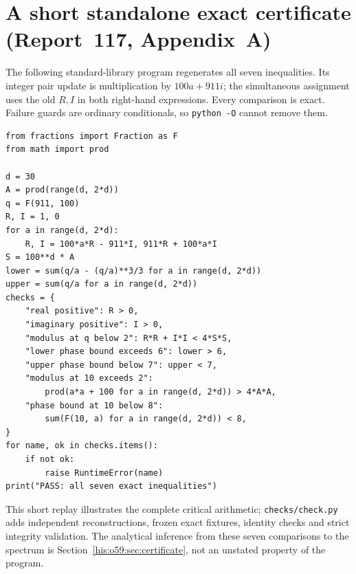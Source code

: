 \documentclass[11pt]{article}
\theoremstyle{remark}\newtheorem{remark}[theorem]{Remark}
\numberwithin{equation}{section}
\begin{document}
\section{A short standalone exact certificate (Report~117, Appendix~A)}\label{his:o59:app:certificate}
The following standard-library program regenerates all seven
inequalities. Its integer pair update is multiplication by
$100a+911i$; the simultaneous assignment uses the old $R,I$ in both
right-hand expressions. Every comparison is exact. Failure guards
are ordinary conditionals, so \texttt{python -O} cannot remove them.
\begin{verbatim}
from fractions import Fraction as F
from math import prod

d = 30
A = prod(range(d, 2*d))
q = F(911, 100)
R, I = 1, 0
for a in range(d, 2*d):
    R, I = 100*a*R - 911*I, 911*R + 100*a*I
S = 100**d * A
lower = sum(q/a - (q/a)**3/3 for a in range(d, 2*d))
upper = sum(q/a for a in range(d, 2*d))
checks = {
    "real positive": R > 0,
    "imaginary positive": I > 0,
    "modulus at q below 2": R*R + I*I < 4*S*S,
    "lower phase bound exceeds 6": lower > 6,
    "upper phase bound below 7": upper < 7,
    "modulus at 10 exceeds 2":
        prod(a*a + 100 for a in range(d, 2*d)) > 4*A*A,
    "phase bound at 10 below 8":
        sum(F(10, a) for a in range(d, 2*d)) < 8,
}
for name, ok in checks.items():
    if not ok:
        raise RuntimeError(name)
print("PASS: all seven exact inequalities")
\end{verbatim}
This short replay illustrates the complete critical arithmetic;
\texttt{checks/check.py} adds independent reconstructions, frozen exact
fixtures, identity checks and strict integrity validation. The
analytical inference from these seven comparisons to the spectrum
is Section~\ref{his:o59:sec:certificate}, not an unstated property of the program.
\end{document}

